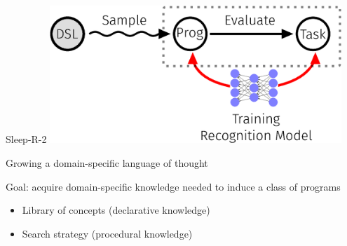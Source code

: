 \documentclass{beamer}
\begin{document}
\begin{frame}[t]{Sleep-R-2}
  \includegraphics[width = 11cm]{figures/animation/Sleep-R-2.eps}

\end{frame}


\begin{frame}{Growing a domain-specific language of thought}
  
  Goal: acquire domain-specific knowledge needed to induce a class of programs


  
  \pause
  \vspace{1cm}

  \begin{itemize}
  \item Library of concepts (declarative knowledge)
    \item Search strategy (procedural knowledge)
    \end{itemize}
\end{frame}
\end{document}
